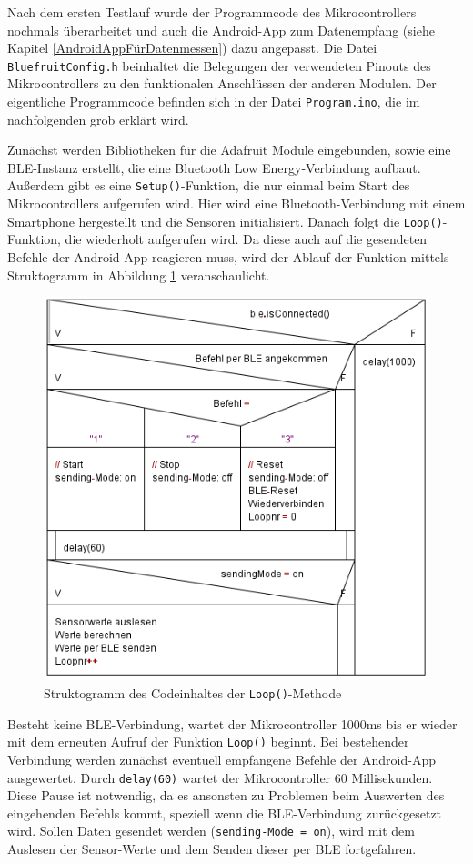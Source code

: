 Nach dem ersten Testlauf wurde der Programmcode des Mikrocontrollers nochmals überarbeitet und auch die Android-App zum Datenempfang (siehe Kapitel \ref{AndroidAppFürDatenmessen}) dazu angepasst. Die Datei \texttt{BluefruitConfig.h} beinhaltet die Belegungen der verwendeten Pinouts des Mikrocontrollers zu den funktionalen Anschlüssen der anderen Modulen. Der eigentliche Programmcode befinden sich in der Datei \texttt{Program.ino}, die im nachfolgenden grob erklärt wird.

Zunächst werden Bibliotheken für die Adafruit Module eingebunden, sowie eine BLE-Instanz erstellt, die eine Bluetooth Low Energy-Verbindung aufbaut. Außerdem gibt es eine \texttt{Setup()}-Funktion, die nur einmal beim Start des Mikrocontrollers aufgerufen wird. Hier wird eine Bluetooth-Verbindung mit einem Smartphone hergestellt und die Sensoren initialisiert. Danach folgt die \texttt{Loop()}-Funktion, die wiederholt aufgerufen wird. Da diese auch auf die gesendeten Befehle der Android-App reagieren muss, wird der Ablauf der Funktion mittels Struktogramm in Abbildung \ref{fig:k3_loopstructo} veranschaulicht.

\begin{figure}[h]
	\centering
	\includegraphics{images/k3-loopstructo.png}
	\caption {Struktogramm des Codeinhaltes der \texttt{Loop()}-Methode}
	\label{fig:k3_loopstructo}
\end{figure}

Besteht keine BLE-Verbindung, wartet der Mikrocontroller 1000ms bis er wieder mit dem erneuten Aufruf der Funktion \texttt{Loop()} beginnt. Bei bestehender Verbindung werden zunächst eventuell empfangene Befehle der Android-App ausgewertet. Durch \texttt{delay(60)} wartet der Mikrocontroller 60 Millisekunden. Diese Pause ist notwendig, da es ansonsten zu Problemen beim Auswerten des eingehenden Befehls kommt, speziell wenn die BLE-Verbindung zurückgesetzt wird. Sollen Daten gesendet werden (\texttt{sending-Mode = on}), wird mit dem Auslesen der Sensor-Werte und dem Senden dieser per BLE fortgefahren. 

